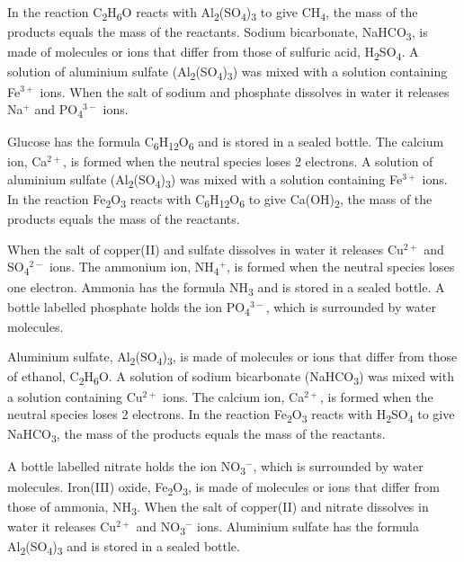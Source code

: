 \documentclass[11pt]{article}
\begin{document}
In the reaction C\textsubscript{2}H\textsubscript{6}O reacts with Al\textsubscript{2}(SO\textsubscript{4})\textsubscript{3} to give CH\textsubscript{4}, the mass of the products equals the mass of the reactants. Sodium bicarbonate, NaHCO\textsubscript{3}, is made of molecules or ions that differ from those of sulfuric acid, H\textsubscript{2}SO\textsubscript{4}. A solution of aluminium sulfate (Al\textsubscript{2}(SO\textsubscript{4})\textsubscript{3}) was mixed with a solution containing Fe$^{3+}$ ions. When the salt of sodium and phosphate dissolves in water it releases Na$^{+}$ and PO\textsubscript{4}$^{3-}$ ions.

Glucose has the formula C\textsubscript{6}H\textsubscript{12}O\textsubscript{6} and is stored in a sealed bottle. The calcium ion, Ca$^{2+}$, is formed when the neutral species loses 2 electrons. A solution of aluminium sulfate (Al\textsubscript{2}(SO\textsubscript{4})\textsubscript{3}) was mixed with a solution containing Fe$^{3+}$ ions. In the reaction Fe\textsubscript{2}O\textsubscript{3} reacts with C\textsubscript{6}H\textsubscript{12}O\textsubscript{6} to give Ca(OH)\textsubscript{2}, the mass of the products equals the mass of the reactants.

When the salt of copper(II) and sulfate dissolves in water it releases Cu$^{2+}$ and SO\textsubscript{4}$^{2-}$ ions. The ammonium ion, NH\textsubscript{4}$^{+}$, is formed when the neutral species loses one electron. Ammonia has the formula NH\textsubscript{3} and is stored in a sealed bottle. A bottle labelled phosphate holds the ion PO\textsubscript{4}$^{3-}$, which is surrounded by water molecules.

Aluminium sulfate, Al\textsubscript{2}(SO\textsubscript{4})\textsubscript{3}, is made of molecules or ions that differ from those of ethanol, C\textsubscript{2}H\textsubscript{6}O. A solution of sodium bicarbonate (NaHCO\textsubscript{3}) was mixed with a solution containing Cu$^{2+}$ ions. The calcium ion, Ca$^{2+}$, is formed when the neutral species loses 2 electrons. In the reaction Fe\textsubscript{2}O\textsubscript{3} reacts with H\textsubscript{2}SO\textsubscript{4} to give NaHCO\textsubscript{3}, the mass of the products equals the mass of the reactants.

A bottle labelled nitrate holds the ion NO\textsubscript{3}$^{-}$, which is surrounded by water molecules. Iron(III) oxide, Fe\textsubscript{2}O\textsubscript{3}, is made of molecules or ions that differ from those of ammonia, NH\textsubscript{3}. When the salt of copper(II) and nitrate dissolves in water it releases Cu$^{2+}$ and NO\textsubscript{3}$^{-}$ ions. Aluminium sulfate has the formula Al\textsubscript{2}(SO\textsubscript{4})\textsubscript{3} and is stored in a sealed bottle.
\end{document}
